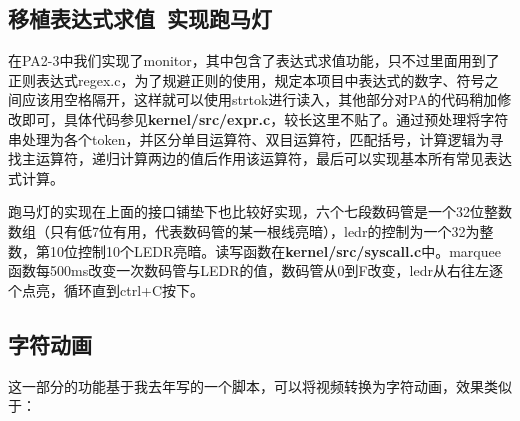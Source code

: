 \documentclass[]{article}
\begin{document}
  \subsection{移植表达式求值\ 实现跑马灯}
  在PA2-3中我们实现了monitor，其中包含了表达式求值功能，只不过里面用到了正则表达式regex.c，为了规避正则的使用，规定本项目中表达式的数字、符号之间应该用空格隔开，这样就可以使用strtok进行读入，其他部分对PA的代码稍加修改即可，具体代码参见\textbf{kernel/src/expr.c}，较长这里不贴了。通过预处理将字符串处理为各个token，并区分单目运算符、双目运算符，匹配括号，计算逻辑为寻找主运算符，递归计算两边的值后作用该运算符，最后可以实现基本所有常见表达式计算。
  
  跑马灯的实现在上面的接口铺垫下也比较好实现，六个七段数码管是一个32位整数数组（只有低7位有用，代表数码管的某一根线亮暗），ledr的控制为一个32为整数，第10位控制10个LEDR亮暗。读写函数在\textbf{kernel/src/syscall.c}中。marquee函数每500ms改变一次数码管与LEDR的值，数码管从0到F改变，ledr从右往左逐个点亮，循环直到ctrl+C按下。
  \subsection{字符动画}
  这一部分的功能基于我去年写的一个脚本，可以将视频转换为字符动画，效果类似于：
\end{document}
